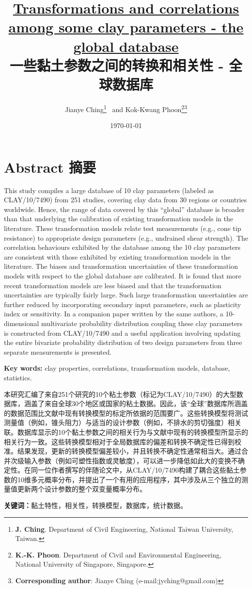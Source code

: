 \documentclass{myarticle}
\title{\textbf{\href{http://dx.doi.org/10.1139/cgj-2013-0262}{Transformations and correlations among some clay parameters - the global database}\\一些黏土参数之间的转换和相关性 - 全球数据库}}
\date{\today}
\author{Jianye Ching\thanks{
    \textbf{J. Ching}. Department of Civil Engineering, National Taiwan University, Taiwan.
} ~and Kok-Kwang Phoon\thanks{
    \textbf{K.-K. Phoon}. Department of Civil and Environmental Engineering, National University of Singapore, Singapore.
}\thanks{
    \textbf{Corresponding author}: Jianye Ching (e-mail:jyching@gmail.com)
}}
\begin{document}
\maketitle

\section*{Abstract 摘要}

\begin{Parallel}{0.60\textwidth}{}
    \ParallelLText
    {
        This study compiles a large database of 10 clay parameters (labeled as CLAY/10/7490) from 251 studies, covering clay data from 30 regions or countries worldwide. Hence, the range of data covered by this “global” database is broader than that underlying the calibration of existing transformation models in the literature. These transformation models relate test measurements (e.g., cone tip resistance) to appropriate design parameters (e.g., undrained shear strength). The correlation behaviours exhibited by the database among the 10 clay parameters are consistent with those exhibited by existing transformation models in the literature. The biases and transformation uncertainties of these transformation models with respect to the global database are calibrated. It is found that more recent transformation models are less biased and that the transformation uncertainties are typically fairly large. Such large transformation uncertainties are further reduced by incorporating secondary input parameters, such as plasticity index or sensitivity. In a companion paper written by the same authors, a 10-dimensional multivariate probability distribution coupling these clay parameters is constructed from CLAY/10/7490 and a useful application involving updating the entire bivariate probability distribution of two design parameters from three separate measurements is presented.

        \textbf{Key words: }clay properties, correlations, transformation models, database, statistics.
    }
    \ParallelRText
    {
        本研究汇编了来自251个研究的10个粘土参数（标记为CLAY/10/7490）的大型数据库，涵盖了来自全球30个地区或国家的粘土数据。因此，该“全球”数据库所涵盖的数据范围比文献中现有转换模型的标定所依据的范围要广。这些转换模型将测试测量值（例如，锥头阻力）与适当的设计参数（例如，不排水的剪切强度）相关联。数据库显示的10个黏土参数之间的相关行为与文献中现有的转换模型所显示的相关行为一致。这些转换模型相对于全局数据库的偏差和转换不确定性已得到校准。结果发现，更新的转换模型偏差较小，并且转换不确定性通常相当大。通过合并次级输入参数（例如可塑性指数或灵敏度），可以进一步降低如此大的变换不确定性。在同一位作者撰写的伴随论文中，从CLAY/10/7490构建了耦合这些黏土参数的10维多元概率分布，并提出了一个有用的应用程序，其中涉及从三个独立的测量值更新两个设计参数的整个双变量概率分布。

        \textbf{关键词：}黏土特性，相关性，转换模型，数据库，统计数据。
    }
\end{Parallel}
\end{document}
